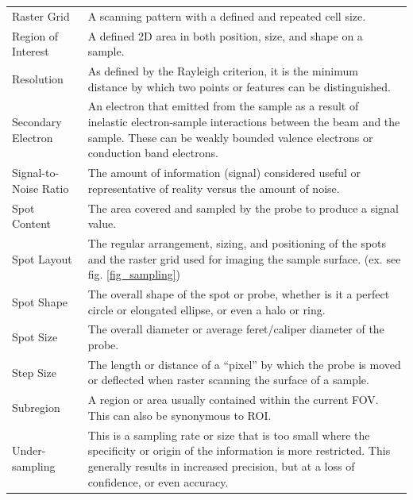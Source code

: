\documentclass[12pt]{article}
\begin{document}
\begin{center}
\begin{longtable}{p{4.25cm} p{11.25cm}}
        Raster Grid & A scanning pattern with a defined and repeated cell size. \\
        
        Region of Interest & A defined 2D area in both position, size, and shape on a sample. \\
        
        Resolution & As defined by the Rayleigh criterion, it is the minimum distance by which two points or features can be distinguished. \\
        
        Secondary Electron & An electron that emitted from the sample as a result of inelastic electron-sample interactions between the beam and the sample. These can be weakly bounded valence electrons or conduction band electrons. \\
        
        Signal-to-Noise Ratio & The amount of information (signal) considered useful or representative of reality versus the amount of noise. \\

        Spot Content & The area covered and sampled by the probe to produce a signal value. \\

        Spot Layout & The regular arrangement, sizing, and positioning of the spots and the raster grid used for imaging the sample surface. (ex. see fig. \ref{fig_sampling}) \\
        
        Spot Shape & The overall shape of the spot or probe, whether is it a perfect circle or elongated ellipse, or even a halo or ring. \\
        
        Spot Size & The overall diameter or average feret/caliper diameter of the probe. \\
        
        Step Size & The length or distance of a ``pixel'' by which the probe is moved or deflected when raster scanning the surface of a sample. \\
        
        Subregion & A region or area usually contained within the current FOV. This can also be synonymous to ROI. \\

        Under-sampling & This is a sampling rate or size that is too small where the specificity or origin of the information is more restricted. This generally results in increased precision, but at a loss of confidence, or even accuracy. \\
        \bottomrule
    \end{longtable} 
\end{center}
\end{document}
